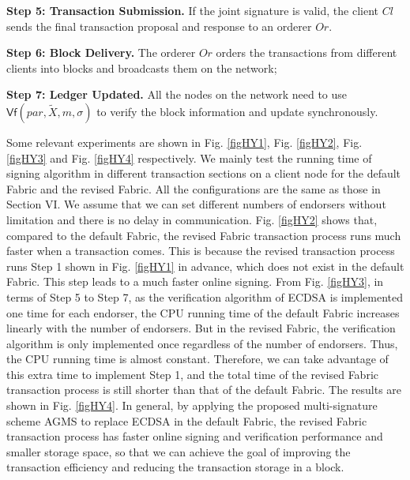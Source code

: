 \documentclass[journal]{IEEEtran}
\begin{document}
\noindent\textbf{Step 5: Transaction Submission.} If the joint signature is valid, the client \(Cl\) sends the final transaction proposal and response to an orderer \(Or\).

\noindent\textbf{Step 6: Block Delivery.} The orderer \(Or\) orders the transactions from different clients into blocks and broadcasts them on the network;

\noindent\textbf{Step 7: Ledger Updated.} All the nodes on the network need to use \(\textsf{Vf}(par,\tilde{X},m,\sigma)\) to verify the block information and update synchronously.



Some relevant experiments are shown in Fig. \ref{figHY1}, Fig. \ref{figHY2}, Fig. \ref{figHY3} and Fig. \ref{figHY4} respectively. We mainly test the running time of signing algorithm in different transaction sections on a client node for the default Fabric and the revised Fabric. All the configurations are the same as those in Section VI. We assume that we can set different numbers of endorsers without limitation and there is no delay in communication. Fig. \ref{figHY2} shows that, compared to the default Fabric, the revised Fabric transaction process runs much faster when a transaction comes. This is because the revised transaction process runs Step 1 shown in Fig. \ref{figHY1} in advance, which does not exist in the default Fabric. This step leads to a much faster online signing.
From Fig. \ref{figHY3}, in terms of Step 5 to Step 7, as the verification algorithm of ECDSA is implemented one time for each endorser, the CPU running time of the default Fabric increases linearly with the number of endorsers. But in the revised Fabric, the verification algorithm is only implemented once regardless of the number of endorsers. Thus, the CPU running time is almost constant.
Therefore, we can take advantage of this extra time to implement Step 1, and the total time of the revised Fabric transaction process is still shorter than that of the default Fabric. The results are shown in Fig. \ref{figHY4}.
In general, by applying the proposed multi-signature scheme AGMS to replace ECDSA in the default Fabric, the revised Fabric transaction process has faster online signing and verification performance and smaller storage space, so that we can achieve the goal of improving the transaction efficiency and reducing the transaction storage in a block.
\end{document}
